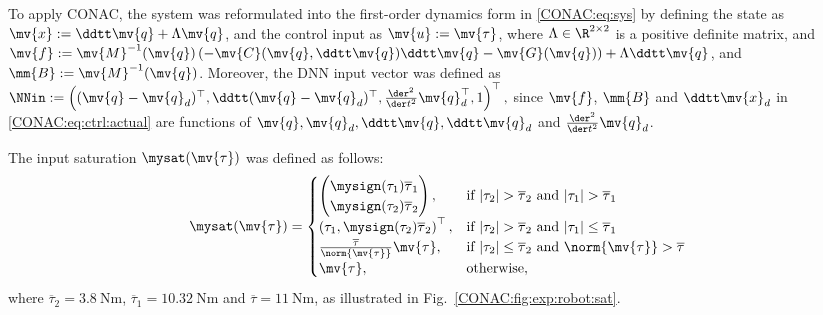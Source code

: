 To apply CONAC, the system was reformulated into the first-order dynamics form in \eqref{CONAC:eq:sys} by defining the state as $\mv{x} := \ddtt\mv{q}+\Lambda\mv{q}$, and the control input as $\mv{u} := \mv{\tau}$, where $\Lambda\in\R^{2\times2}$ is a positive definite matrix, and $\mv{f}:=\mv{M}^{-1}(\mv{q})\left(-\mv{C}(\mv{q},\ddtt\mv{q})\ddtt\mv{q}-\mv{G}(\mv{q})\right)+\Lambda\ddtt\mv{q}$, and $\mm{B}:=\mv{M}^{-1}(\mv{q})$.
Moreover, the DNN input vector was defined as 
$
  \NNin 
  := 
  \left(
    (\mv{q}-\mv{q}_d)^\top
    ,
    \ddtt(\mv{q}-\mv{q}_d)^\top
    ,
    \tfrac{\der^2}{\der t^2}\mv{q}_d^\top
    ,
    1
  \right)^\top
  ,
$
since $\mv{f}$, $\mm{B}$ and $\ddtt\mv{x}_d$ in \eqref{CONAC:eq:ctrl:actual} are functions of $\mv{q},\mv{q}_d,\ddtt\mv{q},\ddtt\mv{q}_d$ and $\tfrac{\der^2}{\der t^2}\mv{q}_d$.

The input saturation $\mysat(\mv{\tau})$ was defined as follows:
\begin{equation} 
  \label{CONAC:eq:exp:sat}
  \mysat(\mv{\tau})
  =
  \begin{cases}
    \begin{pmatrix}
      \mysign(\tau_1)\overline{\tau}_1
      \\
      \mysign(\tau_2)\overline{\tau}_2
    \end{pmatrix}
    , &
    \text{if }
    \vert\tau_2\vert > \overline{\tau}_2
    \text{ and }
    \vert\tau_1\vert > \overline{\tau}_1
    \\
    \left(
      \tau_1
      , 
      \mysign(\tau_2)\overline{\tau}_2
    \right)^\top
    , &
    \text{if }
    \vert\tau_2\vert > \overline{\tau}_2
    \text{ and }
    \vert\tau_1\vert \le \overline{\tau}_1
    \\
    \tfrac{\overline{\tau}}{\norm{\mv{\tau}}}\mv{\tau}
    , &
    \text{if }
    |\tau_2| \le \overline{\tau}_2
    \text{ and }
    \norm{\mv{\tau}} > \overline{\tau}
    \\
    \mv{\tau}
    , &
    \text{otherwise}
    ,
  \end{cases}
\end{equation}
where $\overline{\tau}_2=\qty{3.8}{\newton\meter}$, $\overline{\tau}_1=\qty{10.32}{\newton\meter}$ and $\overline{\tau}=\qty{11}{\newton\meter}$, as illustrated in Fig.~\ref{CONAC:fig:exp:robot:sat}.

